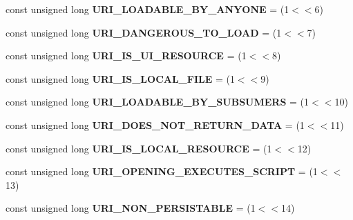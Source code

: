 \begin{DoxyCompactItemize}
const unsigned long {\bfseries U\+R\+I\+\_\+\+L\+O\+A\+D\+A\+B\+L\+E\+\_\+\+B\+Y\+\_\+\+A\+N\+Y\+O\+NE} = (1$<$$<$6)
\item 
\mbox{\label{interfacens_i_protocol_handler_a24974cbfde631507d2106b63c82df326}} 
const unsigned long {\bfseries U\+R\+I\+\_\+\+D\+A\+N\+G\+E\+R\+O\+U\+S\+\_\+\+T\+O\+\_\+\+L\+O\+AD} = (1$<$$<$7)
\item 
\mbox{\label{interfacens_i_protocol_handler_af08b13157235125aa43c6b52af8c98f6}} 
const unsigned long {\bfseries U\+R\+I\+\_\+\+I\+S\+\_\+\+U\+I\+\_\+\+R\+E\+S\+O\+U\+R\+CE} = (1$<$$<$8)
\item 
\mbox{\label{interfacens_i_protocol_handler_a7f84371a28d7bd6249d43998070703ab}} 
const unsigned long {\bfseries U\+R\+I\+\_\+\+I\+S\+\_\+\+L\+O\+C\+A\+L\+\_\+\+F\+I\+LE} = (1$<$$<$9)
\item 
\mbox{\label{interfacens_i_protocol_handler_af47c00f97f0f9611f2eae91d48c5bbb6}} 
const unsigned long {\bfseries U\+R\+I\+\_\+\+L\+O\+A\+D\+A\+B\+L\+E\+\_\+\+B\+Y\+\_\+\+S\+U\+B\+S\+U\+M\+E\+RS} = (1$<$$<$10)
\item 
\mbox{\label{interfacens_i_protocol_handler_a08e6aae31681de1ad97c58fec5a9438c}} 
const unsigned long {\bfseries U\+R\+I\+\_\+\+D\+O\+E\+S\+\_\+\+N\+O\+T\+\_\+\+R\+E\+T\+U\+R\+N\+\_\+\+D\+A\+TA} = (1$<$$<$11)
\item 
\mbox{\label{interfacens_i_protocol_handler_a42aa2be67830b1360120ebed56a7bd00}} 
const unsigned long {\bfseries U\+R\+I\+\_\+\+I\+S\+\_\+\+L\+O\+C\+A\+L\+\_\+\+R\+E\+S\+O\+U\+R\+CE} = (1$<$$<$12)
\item 
\mbox{\label{interfacens_i_protocol_handler_aecda88004bdcdaa62fe6594f724b9e09}} 
const unsigned long {\bfseries U\+R\+I\+\_\+\+O\+P\+E\+N\+I\+N\+G\+\_\+\+E\+X\+E\+C\+U\+T\+E\+S\+\_\+\+S\+C\+R\+I\+PT} = (1$<$$<$13)
\item 
\mbox{\label{interfacens_i_protocol_handler_abce01d578f827bf615002fe22fbde7f6}} 
const unsigned long {\bfseries U\+R\+I\+\_\+\+N\+O\+N\+\_\+\+P\+E\+R\+S\+I\+S\+T\+A\+B\+LE} = (1$<$$<$14)
$$
\end{DoxyCompactItemize}
